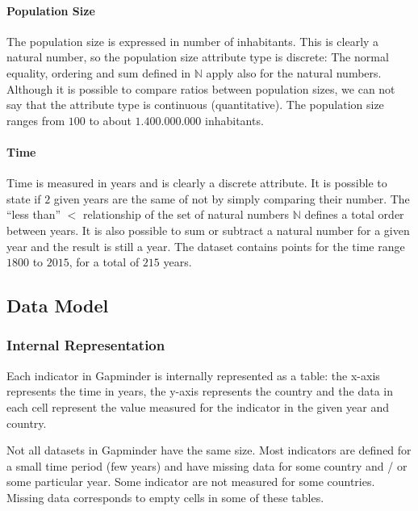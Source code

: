 \paragraph{Population Size}
The population size is expressed in number of inhabitants.
This is clearly a natural number, so the population size attribute type is discrete:
The normal equality, ordering and sum defined in $\mathbb{N}$ apply also for the natural numbers.
Although it is possible to compare ratios between population sizes, we can not say that the attribute type is continuous (quantitative). 
The population size ranges from $100$ to about $1.400.000.000$ inhabitants.

\paragraph{Time}
Time is measured in years and is clearly a discrete attribute.
It is possible to state if $2$ given years are the same of not by simply comparing their number.
The ``less than'' $<$ relationship of the set of natural numbers $\mathbb{N}$ defines a total order between years.
It is also possible to sum or subtract a natural number for a given year and the result is still a year.
The dataset contains points for the time range $1800$ to $2015$, for a total of $215$ years.


\subsection{Data Model}

\subsubsection{Internal Representation}
\label{subsubsec:internal_representation}
Each indicator in Gapminder is internally represented as a table:
the x-axis represents the time in years, the y-axis represents the country and the data in each cell represent the value measured for the indicator in the given year and country.

Not all datasets in Gapminder have the same size.
Most indicators are defined for a small time period (few years) and have missing data for some country and / or some particular year.
Some indicator are not measured for some countries.
Missing data corresponds to empty cells in some of these tables.

